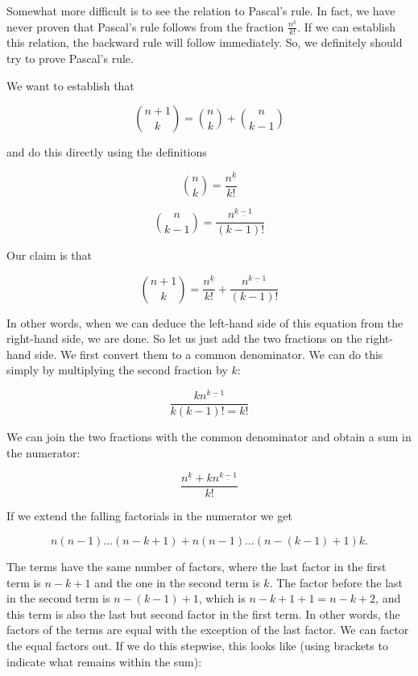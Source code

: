 \documentclass[tikz]{scrreprt}
\begin{document}
Somewhat more difficult is to see the relation to Pascal's rule.
In fact, we have never proven that Pascal's rule follows
from the fraction $\frac{n^{\underline{k}}}{k!}$.
If we can establish this relation, the backward rule
will follow immediately.
So, we definitely should try to prove Pascal's rule.

We want to establish that

\begin{equation}
\binom{n+1}{k} = \binom{n}{k} + \binom{n}{k-1}
\end{equation}

and do this directly using the definitions

\begin{equation}
\binom{n}{k} = \frac{n^{\underline{k}}}{k!}
\end{equation}

\begin{equation}
\binom{n}{k-1} = \frac{n^{\underline{k-1}}}{(k-1)!}
\end{equation}

Our claim is that

\begin{equation}\label{eq:Pascal1}
\binom{n+1}{k} = 
\frac{n^{\underline{k}}}{k!} +
\frac{n^{\underline{k-1}}}{(k-1)!}
\end{equation}

In other words, when we can deduce
the left-hand side of this equation
from the right-hand side, we are done.
So let us just add the two fractions on 
the right-hand side.
We first convert them to a common denominator.
We can do this simply by multiplying
the second fraction by $k$:

\[
\frac{kn^{\underline{k-1}}}{k(k-1)! = k!}
\]

We can join the two fractions with the common
denominator and obtain a sum in the numerator:

\[
\frac{n^{\underline{k}} + kn^{\underline{k-1}}}{k!}
\]

If we extend the falling factorials 
in the numerator we get

\[
n(n-1)\dots(n-k+1) + n(n-1)\dots(n-(k-1)+1)k. 
\]

The terms have the same number of factors,
where the last factor in the first term is $n-k+1$
and the one in the second term is $k$.
The factor before the last in the second term
is $n-(k-1)+1$, which is $n-k+1+1 = n-k+2$,
and this term is also the last but second factor
in the first term.
In other words, the factors of the terms are equal
with the exception of the last factor.
We can factor the equal factors out.
If we do this stepwise, this looks like
(using brackets to indicate what remains within
the sum):
\end{document}

